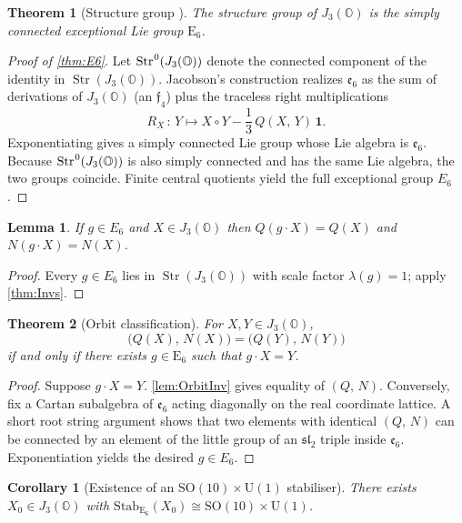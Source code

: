 \documentclass[pdflatex,sn-mathphys-num]{sn-jnl}
\theoremstyle{thmstyleone}
\newtheorem{theorem}{Theorem}
\newtheorem{lemma}{Lemma}
\newtheorem{corollary}{Corollary}
\theoremstyle{thmstyletwo}%
\theoremstyle{thmstylethree}%
\newcommand{\SO}[1]{\mathrm{SO(#1)}}
\newcommand{\U}[1]{\mathrm{U(#1)}}
\newcommand{\E}[1]{\mathrm{E_{#1}}}
\newcommand{\jalg}{J_3(\mathbb{O})}
\newcommand{\SOTen}{\SO{10}}
\newcommand{\UOne}{\U{1}}
\newcommand{\ESix}{\E{6}}
\newcommand{\SOTenXUOne}{\SOTen \times \UOne}
\newcommand{\sm}{\hspace{.065em}}
\newcommand{\Str}{\operatorname{Str}}
\newcommand{\smexp}[1]{^{\sm #1}}
\begin{document}
\begin{theorem}[Structure group {\cite{Springer:2000}}]\label{thm:E6}
The structure group of $\jalg$ is the simply connected exceptional Lie group $\ESix$.
\end{theorem}

\begin{proof}[Proof of \autoref{thm:E6}]
Let $\Str\smexp{0}(\jalg)$ denote the connected component of the identity in
$\Str(\jalg)$.
Jacobson's construction \cite{Jacobson:1968} realizes $\mathfrak e_{6}$ as the
sum of derivations of $\jalg$ (an $\mathfrak f_{4}$) plus the traceless right
multiplications
\[
  R_{X}\,:\, Y\mapsto X\circ Y-\frac13\, Q(X,\,Y)\,\mathbf 1.
\]
Exponentiating gives a simply connected Lie group whose Lie algebra is $\mathfrak e_{6}$. Because $\Str\smexp{0}(\jalg)$ is also simply connected and has the same Lie algebra, the two groups coincide. Finite central quotients yield the full exceptional group $E_{6}$.
\end{proof}

\begin{lemma}\label{lem:OrbitInv}
If $g\in E_{6}$ and $X\in\jalg$ then
$Q(g\cdot X)=Q(X)$ and $N(g\cdot X)=N(X)$.
\end{lemma}

\begin{proof}
Every $g\in E_{6}$ lies in $\Str(\jalg)$ with scale factor $\lambda(g)=1$; apply \autoref{thm:Invs}.
\end{proof}

\begin{theorem}[Orbit classification]\label{thm:OrbitClass}
For $X,Y\in\jalg$,
\[
  \bigl(Q(X),\,N(X)\bigr)=\bigl(Q(Y),\,N(Y)\bigr)
\]
if and only if there exists $g\in\ESix$ such that $g\cdot X = Y$.
\end{theorem}

\begin{proof}
Suppose $g \cdot X=Y$.
\autoref{lem:OrbitInv} gives equality of $(Q,\,N)$.
Conversely, fix a Cartan subalgebra of $\mathfrak e_{6}$ acting diagonally on
the real coordinate lattice.
A short root string argument \cite{Springer:2000} shows that two elements with
identical $(Q,\,N)$ can be connected by an element of the little group of an
$\mathfrak{sl}_{2}$ triple inside $\mathfrak e_{6}$.
Exponentiation yields the desired $g\in E_{6}$.
\end{proof}

\begin{corollary}[Existence of an $\SOTenXUOne$ stabiliser]
\label{cor:Isotropy}
There exists $X_{0}\in J_{3}(\mathbb{O})$ with
$\mathrm{Stab}_{\ESix}(X_{0})\cong \SOTen\times \UOne$.
\end{corollary}
\end{document}
